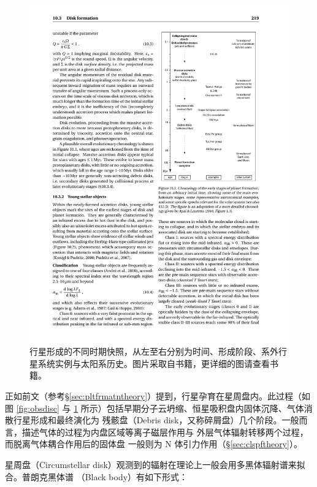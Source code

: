 \begin{figure}[ht!]
\centering
\includegraphics[scale=1.8]{figures/chapter3/f1_pfdisc.pdf}
\caption[行星形成的不同时期快照，从左至右分别为物理时间、形成阶段、系外行星系统实例与太阳系历史，版权所有人 Perryman。]{行星形成的不同时期快照，从左至右分别为时间、形成阶段、系外行星系统实例与太阳系历史。图片采取自书籍，更详细的图请查看书籍。}
\label{fig:pfdics}
\end{figure}


正如前文（参考\S \ref{sec:pltfrmatntheory}）提到，行星孕育在星周盘内。此过程（如图 \ref{fig:obsdisc} 
与 \ref{fig:pfdics} 所示）包括早期分子云坍缩、恒星吸积盘内固体沉降、气体消散行星形成和最终演化为
残骸盘（Debris disk，又称碎屑盘）几个阶段。一般而言，描述气体的过程为内盘区域等离子磁层作用与
外层气体辐射转移两个过程\cite{Dullemond2010}，而脱离气体耦合作用后的固体盘
一般则为 N 体引力作用（\S \ref{sec:clspftheory}）。

星周盘（Circumstellar disk）观测到的辐射在理论上一般会用多黑体辐射谱来拟合。普朗克黑体谱
（Black body）有如下形式：

